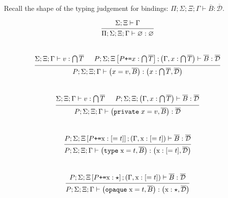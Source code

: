 \documentclass[12pt]{article}
\newcommand{\tx}{\text{\rm x}}
\newcommand{\emptyenv}{\varnothing}
\newcommand{\Gammatop}{\ensuremath{\Xi}}
\newcommand{\Gammabot}{\ensuremath{\Gamma}}
\newcommand{\private}{\texttt{private\;}}
\newcommand{\type}{\texttt{type\;}}
\newcommand{\opaque}{\texttt{opaque\;}}
\begin{document}
Recall the shape of the typing judgement for bindings: $\Pi; \Sigma; \Gammatop; \Gammabot \vdash \overline{B} : \overline{\mathcal{D}}$.

\[
    \begin{prooftree}
        \hypo{ \Sigma; \Gammatop \vdash \Gammabot }
        \infer1{ \Pi; \Sigma; \Gammatop; \Gammabot \vdash \emptyenv : \emptyenv}
    \end{prooftree}
\] \\

\[
    \begin{prooftree}
        \hypo{ \Sigma; \Gammatop; \Gammabot \vdash v: \bigcap \overline{T} }
        \hypo{ P; \Sigma; \Gammatop\left[P \texttt{+=} x : \bigcap \overline{T}\right]; \left(\Gammabot, x : \bigcap \overline{T}\right) \vdash \overline{B} : \overline{\mathcal{D}} }
        \infer2{ P; \Sigma; \Gammatop; \Gammabot \vdash \left(x = v, \overline{B}\right) : \left(x : \bigcap \overline{T}, \overline{\mathcal{D}}\right) }
    \end{prooftree}
\]  \\
\[
    \begin{prooftree}
        \hypo{ \Sigma; \Gammatop; \Gammabot \vdash v : \bigcap \overline{T}}
        \hypo{ P; \Sigma; \Gammatop; \left(\Gammabot, x : \bigcap \overline{T}\right) \vdash \overline{B} : \overline{\mathcal{D}}}
        \infer2{ P; \Sigma; \Gammatop; \Gammabot \vdash \left(\private x = v, \overline{B}\right): \overline{\mathcal{D}} }
    \end{prooftree}
\] \\
\[
    \begin{prooftree}
        \hypo{ P; \Sigma; \Gammatop\left[P \texttt{+=} \tx : [= t]\right]; \left(\Gammabot, \tx : [= t]\right) \vdash \overline{B} : \overline{\mathcal{D}}}
        \infer1{ P; \Sigma; \Gammatop; \Gammabot \vdash \left(\type \tx = t, \overline{B}\right) : \left(\tx : [= t], \overline{\mathcal{D}}\right) }
    \end{prooftree}
\] \\
\[
    \begin{prooftree}
        \hypo{ P; \Sigma; \Gammatop\left[P \texttt{+=} \tx : \star\right]; \left(\Gammabot, \tx : [= t]\right) \vdash \overline{B} : \overline{\mathcal{D}} }
        \infer1{ P; \Sigma; \Gammatop; \Gammabot \vdash \left(\opaque \tx = t, \overline{B}\right) : \left(\tx : \star, \overline{\mathcal{D}}\right) }
    \end{prooftree}
\] \\
\end{document}

